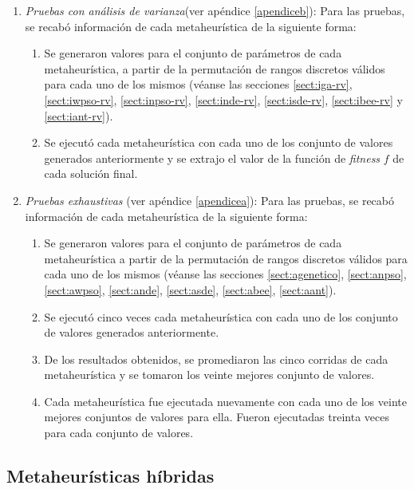 \begin{enumerate}
    \item \emph{Pruebas con análisis de varianza}(ver apéndice \ref{apendiceb}):
            Para las pruebas, se recabó información de cada metaheurística de la
        siguiente forma:
        \begin{enumerate}
            \item Se generaron valores para el conjunto de parámetros de cada
        metaheurística, a partir de la permutación de rangos discretos válidos para cada
        uno de los mismos (véanse las secciones \ref{sect:iga-rv}, \ref{sect:iwpso-rv},
        \ref{sect:inpso-rv}, \ref{sect:inde-rv}, \ref{sect:isde-rv},
        \ref{sect:ibee-rv} y \ref{sect:iant-rv}).
            \item Se ejecutó cada metaheurística con cada uno de los conjunto de
        valores generados anteriormente y se extrajo el valor de la función de
        \emph{fitness} $f$ de cada solución final.
        \end{enumerate}
	\item \emph{Pruebas exhaustivas} (ver apéndice \ref{apendicea}):
            Para las pruebas, se recabó información de cada metaheurística de la
        siguiente forma:
        \begin{enumerate}
            \item Se generaron valores para el conjunto de parámetros de cada
        metaheurística a partir de la permutación de rangos discretos válidos para cada
        uno de los mismos (véanse las secciones  \ref{sect:agenetico}, \ref{sect:anpso},
        \ref{sect:awpso}, \ref{sect:ande}, \ref{sect:asde}, \ref{sect:abee},
        \ref{sect:aant}).
            \item Se ejecutó cinco veces cada metaheurística con cada uno de los     
        conjunto de valores generados anteriormente.
            \item De los resultados obtenidos, se promediaron las cinco corridas de cada
        metaheurística y se tomaron los veinte mejores conjunto de valores.
            \item Cada metaheurística fue ejecutada nuevamente con cada uno de los veinte
        mejores conjuntos de valores para ella. Fueron ejecutadas treinta veces para
        cada conjunto de valores.
        \end{enumerate}
\end{enumerate}

\subsection{Metaheurísticas híbridas}\label{exp:hibrido}

